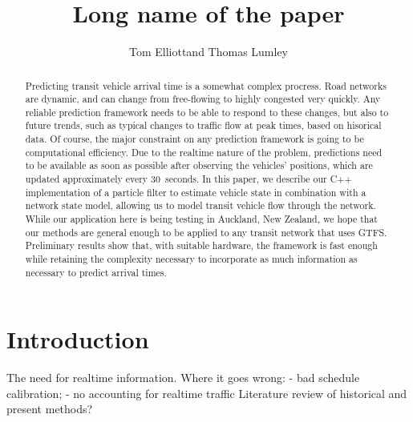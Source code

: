 \documentclass[times, doublespace]{anzsauth}
\begin{document}
\cleanlookdateon
{}
\title{Long name of the paper}
\author{Tom Elliott\corrauth and Thomas Lumley}
\address{
    Department of Statistics, University of Auckland,\\
    Private Bag 92019, Auckland 1142, New Zealand\\
    Email: \texttt{tom.elliott@auckland.ac.nz}
}

\begin{abstract}
Predicting transit vehicle arrival time is a somewhat complex procress.
Road networks are dynamic, and can change from free-flowing to highly congested
very quickly.
Any reliable prediction framework needs to be able to respond to these changes,
but also to future trends, such as typical changes to traffic flow
at peak times, based on hisorical data.
Of course, the major constraint on any prediction framework is going to be
computational efficiency.
Due to the realtime nature of the problem, predictions need to be 
available as soon as possible after observing the vehicles' positions,
which are updated approximately every 30~seconds.
In this paper, we describe our C++ implementation of a particle filter to estimate
vehicle state in combination with a network state model,
allowing us to model transit vehicle flow through the network.
While our application here is being testing in Auckland, New Zealand,
we hope that our methods are general enough to be applied to any
transit network that uses GTFS.
Preliminary results show that, with suitable hardware,
the framework is fast enough while retaining the complexity necessary
to incorporate as much information as necessary to predict arrival times.
\end{abstract}


\maketitle
\section{Introduction}
\label{sec:intro}


The need for realtime information.
Where it goes wrong: 
- bad schedule calibration;
- no accounting for realtime traffic 
Literature review of historical and present methods?
\end{document}
